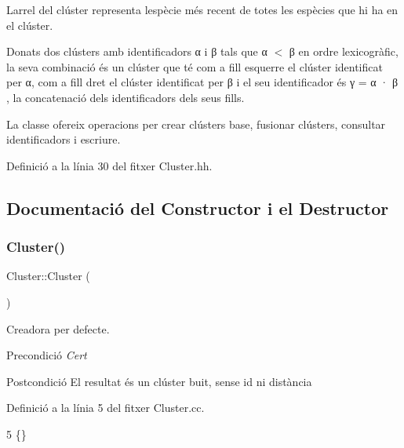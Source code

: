 L\textquotesingle{}arrel del clúster representa l\textquotesingle{}espècie més recent de totes les espècies que hi ha en el clúster.

Donats dos clústers amb identificadors α i β tals que α $<$ β en ordre lexicogràfic, la seva combinació és un clúster que té com a fill esquerre el clúster identificat per α, com a fill dret el clúster identificat per β i el seu identificador és γ = α · β , la concatenació dels identificadors dels seus fills.

La classe ofereix operacions per crear clústers base, fusionar clústers, consultar identificadors i escriure. 

Definició a la línia 30 del fitxer Cluster.\+hh.



\subsection{Documentació del Constructor i el Destructor}
\mbox{\label{class_cluster_aee7feb1d599d4c8fda6c3ee83e86ba81}} 
\subsubsection{\texorpdfstring{Cluster()}{Cluster()}\hspace{0.1cm}{\footnotesize\ttfamily [1/2]}}
{\footnotesize\ttfamily Cluster\+::\+Cluster (\begin{DoxyParamCaption}{ }\end{DoxyParamCaption})}



Creadora per defecte. 

\begin{DoxyPrecond}{Precondició}
{\itshape Cert} 
\end{DoxyPrecond}
\begin{DoxyPostcond}{Postcondició}
El resultat és un clúster buit, sense id ni distància 
\end{DoxyPostcond}


Definició a la línia 5 del fitxer Cluster.\+cc.


\begin{DoxyCode}
5 \{\}
\end{DoxyCode}
\mbox{\label{class_cluster_abd445aca5dbd737d7366bfa8fa1b44ea}} 
